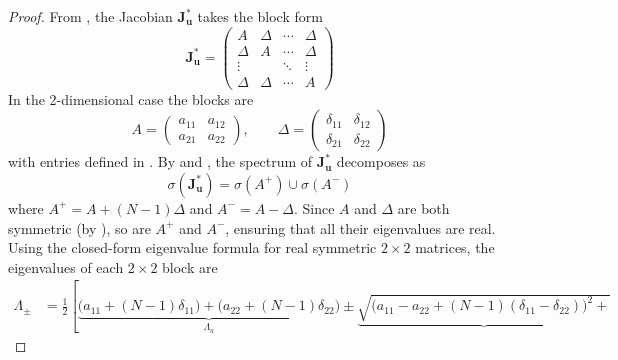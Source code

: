 \documentclass{article}
\begin{document}
            \begin{proof}
                From , the Jacobian $\mathbf{J}_{\mathbf{u}}^*$ takes the block form
                \begin{equation}
                    \mathbf{J}_{\mathbf{u}}^* = \begin{pmatrix}
                        A & \Delta & \cdots & \Delta \\
                        \Delta & A & \cdots & \Delta \\
                        \vdots & & \ddots & \vdots \\
                        \Delta & \Delta & \cdots & A
                    \end{pmatrix}
                \end{equation}
                In the 2-dimensional case the blocks are
                \begin{equation}
                    A = \begin{pmatrix} a_{11} & a_{12} \\ a_{21} & a_{22} \end{pmatrix}, 
                    \qquad
                    \Delta = \begin{pmatrix} \delta_{11} & \delta_{12} \\ 
                    \delta_{21} & \delta_{22} \end{pmatrix}
                \end{equation}
                with entries defined in . By  and , the spectrum of $\mathbf{J}_{\mathbf{u}}^*$ decomposes as
                \begin{equation}
                    \sigma(\mathbf{J}_{\mathbf{u}}^*) = 
                    \sigma(A^+) \cup \sigma(A^-)
                \end{equation}
                where $A^+ = A + (N-1)\Delta$ and $A^- = A - \Delta$. Since $A$ and $\Delta$ are both symmetric (by ), so are $A^+$ and $A^-$, ensuring that all their eigenvalues are real. Using the closed-form eigenvalue formula for real symmetric $2\times 2$ matrices, the eigenvalues of each $2\times 2$ block are
                \begin{align}
                    \Lambda_{\pm} &= \frac{1}{2}\left[
                    \underbrace{\bigl(a_{11}+(N-1)\delta_{11}\bigr) + \bigl(a_{22}+(N-1)\delta_{22}\bigr)}_{\Lambda_a}
                    \pm 
                    \underbrace{\sqrt{\bigl(a_{11}-a_{22}+(N-1)(\delta_{11}-\delta_{22})\bigr)^2 + 
}}
\end{align}
\end{proof}
\end{document}
